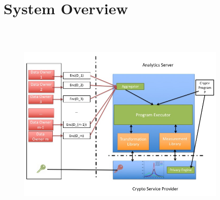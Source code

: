 
\section{System Overview} \begin{figure}\includegraphics[height=10cm, width=10cm]{system-diagram.jpg}\end{figure}
